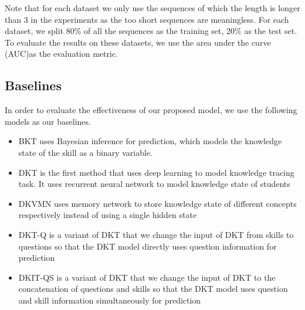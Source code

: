 Note that for each dataset we only use the sequences of which the length is longer than 3 in the experiments as the too short sequences are meaningless. For each dataset, we split 80\% of all the sequences as the training set, 20\% as the test set. To evaluate the results on these datasets, we use the area under the curve (AUC)as the evaluation metric.

\subsection{Baselines}
In order to evaluate the effectiveness of our proposed model, we use the following models as our baselines.
\begin{itemize}
	\item BKT uses Bayesian inference for prediction, which models the knowledge state of the skill as a binary variable.
	\item DKT is the first method that uses deep learning to model knowledge tracing task. It uses recurrent neural network to model knowledge state of students
	\item DKVMN uses memory network to store knowledge state of different concepts respectively instead of using a single hidden state
	\item DKT-Q is a variant of DKT that we change the input of DKT from skills to questions so that the DKT model directly uses question information for prediction
	\item DKIT-QS is a variant of DKT that we change the input of DKT to the concatenation of questions and skills so that the DKT model uses question and skill information simultaneously for prediction
\end{itemize}



